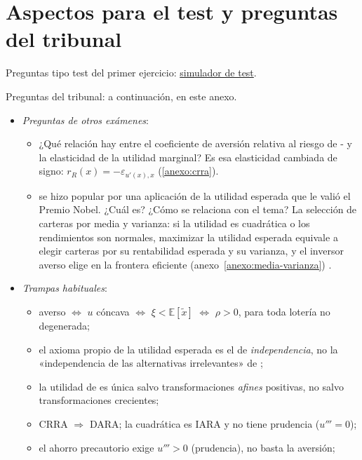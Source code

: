 \documentclass[11pt]{article}
\begin{document}
\section{Aspectos para el test y preguntas del tribunal}\label{anexo:test}

\begin{anotaciones}
Preguntas tipo test del primer ejercicio: \href{https://www.victorgutierrezmarcos.es/oposicion/temario/primer-ejercicio/test/simulador.html?tema=3.A.10}{simulador de test}.

Preguntas del tribunal: a continuación, en este anexo.
\end{anotaciones}

\begin{itemize}
\item \emph{Preguntas de otros exámenes}:
  \begin{itemize}
  \item ¿Qué relación hay entre el coeficiente de aversión relativa al riesgo de - y la elasticidad de la utilidad marginal? Es esa elasticidad cambiada de signo: $r_R(x)=-\varepsilon_{u'(x),x}$ (\ref{anexo:crra}).
  \item {} se hizo popular por una aplicación de la utilidad esperada que le valió el Premio Nobel. ¿Cuál es? ¿Cómo se relaciona con el tema? La selección de carteras por media y varianza\nocite{Markowitz1952Portfolio}: si la utilidad es cuadrática o los rendimientos son normales, maximizar la utilidad esperada equivale a elegir carteras por su rentabilidad esperada y su varianza, y el inversor averso elige en la frontera eficiente (anexo~\ref{anexo:media-varianza}) .
  \end{itemize}
\item \emph{Trampas habituales}:
  \begin{itemize}
  \item averso $\iff$ $u$ cóncava $\iff$ $\xi<\mathbb{E}[\tilde{x}]$ $\iff$ $\rho>0$, para toda lotería no degenerada;
  \item el axioma propio de la utilidad esperada es el de \emph{independencia}, no la «independencia de las alternativas irrelevantes» de ;
  \item la utilidad de  es única salvo transformaciones \emph{afines} positivas, no salvo transformaciones crecientes;
  \item CRRA $\Rightarrow$ DARA; la cuadrática es IARA y no tiene prudencia ($u'''=0$);
  \item el ahorro precautorio exige $u'''>0$ (prudencia), no basta la aversión;

\end{itemize}
\end{itemize}
\end{document}
